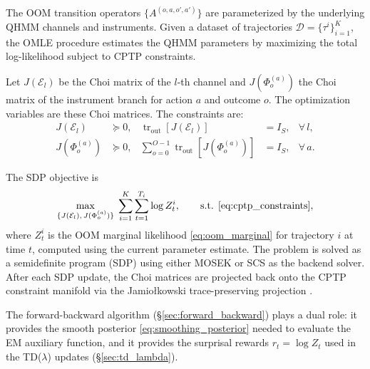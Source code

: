The OOM transition operators $\{A^{(o,a,o',a')}\}$ are parameterized by
the underlying QHMM channels and instruments. Given a dataset of
trajectories $\mathcal{D} = \{\tau^i\}_{i=1}^K$, the OMLE procedure
estimates the QHMM parameters by maximizing the total log-likelihood
subject to CPTP constraints.


Let $J(\mathcal{E}_l)$ be the Choi matrix of the $l$-th channel and
$J(\Phi^{(a)}_o)$ the Choi matrix of the instrument branch for action $a$
and outcome $o$. The optimization variables are these Choi matrices. The
constraints are:
\begin{subequations}
\label{eq:cptp_constraints}
\begin{align}
J(\mathcal{E}_l) &\succeq 0,
& \operatorname{tr}_{\mathrm{out}}[J(\mathcal{E}_l)] &= I_S,
& \forall\, l, \tag{2.7a} \\
J(\Phi^{(a)}_o) &\succeq 0,
& \sum_{o=0}^{O-1} \operatorname{tr}_{\mathrm{out}}[J(\Phi^{(a)}_o)] &= I_S,
& \forall\, a. \tag{2.7b}
\end{align}
\end{subequations}


The SDP objective is
\begin{equation}
\max_{\{J(\mathcal{E}_l),\, J(\Phi^{(a)}_o)\}}
\; \sum_{i=1}^K \sum_{t=1}^{T_i} \log Z^i_t,
\qquad \text{s.t. } \eqref{eq:cptp_constraints},
\label{eq:omle_objective}
\end{equation}
where $Z^i_t$ is the OOM marginal likelihood \eqref{eq:oom_marginal} for
trajectory $i$ at time $t$, computed using the current parameter estimate.
The problem is solved as a semidefinite program (SDP) using either MOSEK
or SCS as the backend solver. After each SDP update, the Choi matrices
are projected back onto the CPTP constraint manifold via the
Jamiołkowski trace-preserving projection \citep{jiang2022structure}.

The forward-backward algorithm (\S\ref{sec:forward_backward}) plays a
dual role: it provides the smooth posterior \eqref{eq:smoothing_posterior}
needed to evaluate the EM auxiliary function, and it provides the
surprisal rewards $r_t = \log Z_t$ used in the TD($\lambda$) updates
(\S\ref{sec:td_lambda}).


